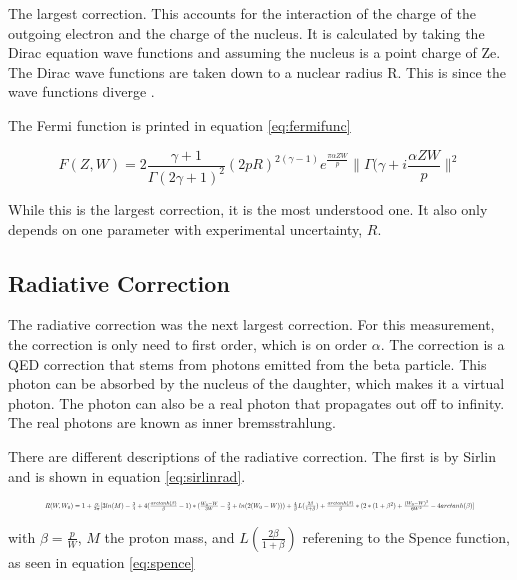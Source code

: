 \documentclass[main.tex]{subfiles}
\begin{document}
The largest correction. 
This accounts for the interaction of the charge of the outgoing electron and the charge of the nucleus.
It is calculated by taking the Dirac equation wave functions and assuming the nucleus is a point charge of Ze.
The Dirac wave functions are taken down to a nuclear radius R.
This is since the wave functions diverge \cite{Wil89}.

The Fermi function is printed in equation \ref{eq:fermifunc}

\begin{equation}
	F(Z,W) = 2\frac{\gamma + 1}{\Gamma(2\gamma +1)^{2}}(2pR)^{2(\gamma - 1)}e^{\frac{\pi\alpha ZW}{p}}\|\Gamma(\gamma + i\frac{\alpha ZW}{p}\|^{2}
	\label{eq:fermifunc}
\end{equation}

While this is the largest correction, it is the most understood one.
It also only depends on one parameter with experimental uncertainty, $R$. 


\subsection{Radiative Correction}
The radiative correction was the next largest correction.
For this measurement, the correction is only need to first order, which is on order $\alpha$.
The correction is a QED correction that stems from photons emitted from the beta particle.
This photon can be absorbed by the nucleus of the daughter, which makes it a virtual photon.
The photon can also be a real photon that propagates out off to infinity.
The real photons are known as inner bremsstrahlung.

There are different descriptions of the radiative correction.  
The first is by Sirlin \cite{Sir67} and is shown in equation \ref{eq:sirlinrad}.

\begin{equation}
	\resizebox{.9\textwidth}{!}
	{
	$R(W,W_{0}) = 1 + \frac{\alpha}{2\pi}[3ln(M) - \frac{3}{4} + 4(\frac{arctanh(\beta)}{\beta} - 1)*(\frac{W_{0} - W}{3W} - \frac{3}{2} + ln(2(W_{0} - W))) + \frac{4}{\beta}L(\frac{2\beta}{1 + \beta}) + \frac{arctanh(\beta)}{\beta}*(2*(1 + \beta^{2}) + \frac{(W_{0} - W)^{2}}{6W^{2}} - 4 arctanh(\beta)]$
	}
	\label{eq:sirlinrad}
\end{equation} 

with $\beta = \frac{p}{W}$, $M$ the proton mass, and $L(\frac{2\beta}{1+\beta})$ referening to the Spence function, as seen in equation \ref{eq:spence} \cite{Wil95}
\end{document}
